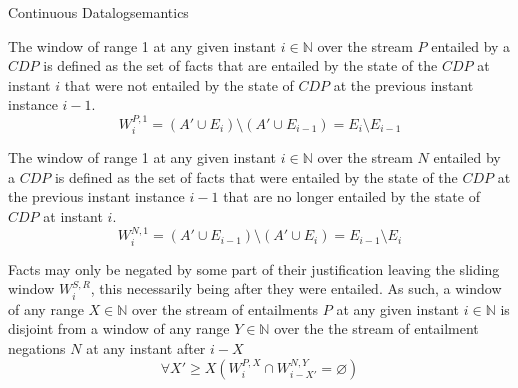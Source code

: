 \begin{nestedsection}{Continuous Datalog}{semantics}
\begin{axiom}
\label{axiom:continuous datalog: positive window increment}
The window of range 1 at any given instant ${i \in \mathbb{N}}$ over
the stream $P$ entailed by a ${CDP}$ is defined as the set of facts
that are entailed by the state of the ${CDP}$ at instant $i$ that were
not entailed by the state of ${CDP}$ at the previous instant instance
${i-1}$.
			\begin{equation*}
				W^{P,1}_{i} = \left( A' \cup E_{i} \right) \setminus \left( A' \cup E_{i-1} \right) = E_{i} \setminus E_{i-1}
			\end{equation*}
\end{axiom}

\begin{axiom}
\label{axiom:continuous datalog: negative window increment}
			The window of range 1 at any given instant ${i \in \mathbb{N}}$ over the stream $N$ entailed by a ${CDP}$ is defined as the set of facts that were entailed by the state of the ${CDP}$ at the previous instant instance ${i-1}$ that are no longer entailed by the state of ${CDP}$ at instant $i$.
			\begin{equation*}
				W^{N,1}_{i} = \left( A' \cup E_{i-1} \right) \setminus \left( A' \cup E_{i} \right) = E_{i-1} \setminus E_{i}
			\end{equation*}
\end{axiom}

\begin{axiom}
\label{axiom:continuous datalog: entailment precedes negation}
			Facts may only be negated by some part of their justification leaving the sliding window $W^{S,R}_{i}$, this necessarily being after they were entailed.
			As such, a window of any range ${X \in \mathbb{N}}$ over the stream of entailments $P$ at any given instant ${i \in \mathbb{N}}$ is disjoint from a window of any range ${Y \in \mathbb{N}}$ over the the stream of entailment negations $N$ at any instant after ${i - X}$
			\begin{equation*}
				\forall X' \geq X \left( W^{P,X}_{i} \cap W^{N,Y}_{i-X'} = \varnothing \right)
			\end{equation*}
\end{axiom}


\end{nestedsection}

